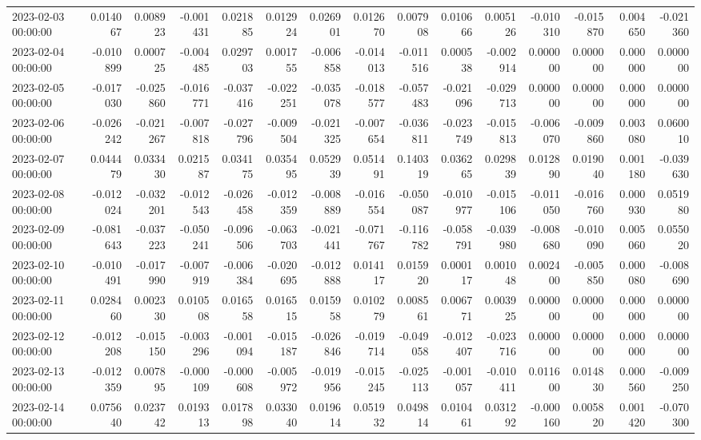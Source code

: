 \begin{tabular}{lrrrrrrrrrrrrrr}
2023-02-03 00:00:00 & 0.014067 & 0.008923 & -0.001431 & 0.021885 & 0.012924 & 0.026901 & 0.012670 & 0.007908 & 0.010666 & 0.005126 & -0.010310 & -0.015870 & 0.004650 & -0.021360 \\
2023-02-04 00:00:00 & -0.010899 & 0.000725 & -0.004485 & 0.029703 & 0.001755 & -0.006858 & -0.014013 & -0.011516 & 0.000538 & -0.002914 & 0.000000 & 0.000000 & 0.000000 & 0.000000 \\
2023-02-05 00:00:00 & -0.017030 & -0.025860 & -0.016771 & -0.037416 & -0.022251 & -0.035078 & -0.018577 & -0.057483 & -0.021096 & -0.029713 & 0.000000 & 0.000000 & 0.000000 & 0.000000 \\
2023-02-06 00:00:00 & -0.026242 & -0.021267 & -0.007818 & -0.027796 & -0.009504 & -0.021325 & -0.007654 & -0.036811 & -0.023749 & -0.015813 & -0.006070 & -0.009860 & 0.003080 & 0.060010 \\
2023-02-07 00:00:00 & 0.044479 & 0.033430 & 0.021587 & 0.034175 & 0.035495 & 0.052939 & 0.051491 & 0.140319 & 0.036265 & 0.029839 & 0.012890 & 0.019040 & 0.001180 & -0.039630 \\
2023-02-08 00:00:00 & -0.012024 & -0.032201 & -0.012543 & -0.026458 & -0.012359 & -0.008889 & -0.016554 & -0.050087 & -0.010977 & -0.015106 & -0.011050 & -0.016760 & 0.000930 & 0.051980 \\
2023-02-09 00:00:00 & -0.081643 & -0.037223 & -0.050241 & -0.096506 & -0.063703 & -0.021441 & -0.071767 & -0.116782 & -0.058791 & -0.039980 & -0.008680 & -0.010090 & 0.005060 & 0.055020 \\
2023-02-10 00:00:00 & -0.010491 & -0.017990 & -0.007919 & -0.006384 & -0.020695 & -0.012888 & 0.014117 & 0.015920 & 0.000117 & 0.001048 & 0.002400 & -0.005850 & 0.000080 & -0.008690 \\
2023-02-11 00:00:00 & 0.028460 & 0.002330 & 0.010508 & 0.016558 & 0.016515 & 0.015958 & 0.010279 & 0.008561 & 0.006771 & 0.003925 & 0.000000 & 0.000000 & 0.000000 & 0.000000 \\
2023-02-12 00:00:00 & -0.012208 & -0.015150 & -0.003296 & -0.001094 & -0.015187 & -0.026846 & -0.019714 & -0.049058 & -0.012407 & -0.023716 & 0.000000 & 0.000000 & 0.000000 & 0.000000 \\
2023-02-13 00:00:00 & -0.012359 & 0.007895 & -0.000109 & -0.000608 & -0.005972 & -0.019956 & -0.015245 & -0.025113 & -0.001057 & -0.010411 & 0.011600 & 0.014830 & 0.000560 & -0.009250 \\
2023-02-14 00:00:00 & 0.075640 & 0.023742 & 0.019313 & 0.017898 & 0.033040 & 0.019614 & 0.051932 & 0.049814 & 0.010461 & 0.031292 & -0.000160 & 0.005820 & 0.001420 & -0.070300 \\

\end{tabular}
